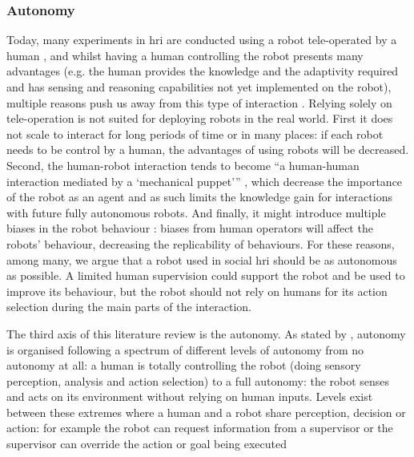 \subsubsection{Autonomy}
	
	Today, many experiments in \gls{hri} are conducted using a robot tele-operated by a human \citep{riek2012wizard,baxter2016characterising}, and whilst having a human controlling the robot presents many advantages (e.g. the human provides the knowledge and the adaptivity required and has sensing and reasoning capabilities not yet implemented on the robot), multiple reasons push us away from this type of interaction \citep{Thill2013}. Relying solely on tele-operation is not suited for deploying robots in the real world. First it does not scale to interact for long periods of time or in many places: if each robot needs to be control by a human, the advantages of using robots will be decreased. Second, the human-robot interaction tends to become ``a human-human interaction mediated by a `mechanical puppet''' \citep{baxter2016characterising}, which decrease the importance of the robot as an agent and as such limits the knowledge gain for interactions with future fully autonomous robots. And finally, it might introduce multiple biases in the robot behaviour \citep{howley2014effects}: biases from human operators will affect the robots' behaviour, decreasing the replicability of behaviours. For these reasons, among many, we argue that a robot used in social \gls{hri} should be as autonomous as possible. A limited human supervision could support the robot and be used to improve its behaviour, but the robot should not rely on humans for its action selection during the main parts of the interaction. 
		
    The third axis of this literature review is the autonomy. As stated by \citet{beer2014toward}, autonomy is organised following a spectrum of different levels of autonomy from no autonomy at all: a human is totally controlling the robot (doing sensory perception, analysis and action selection) to a full autonomy: the robot senses and acts on its environment without relying on human inputs. Levels exist between these extremes where a human and a robot share perception, decision or action: for example the robot can request information from a supervisor or the supervisor can override the action or goal being executed
    

